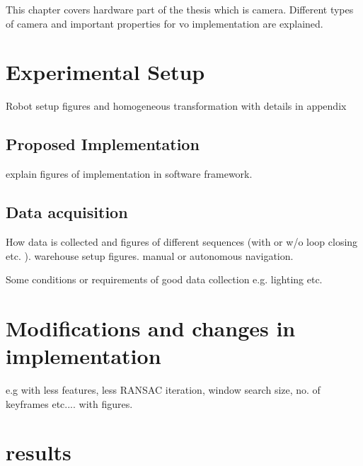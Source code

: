 This chapter covers hardware part of the thesis which is camera. Different types of camera and important properties for \acrshort{vo} implementation are explained.


\section{Experimental Setup}

Robot setup figures and homogeneous transformation with details in appendix

\subsection{Proposed Implementation}
explain figures of implementation in software framework. 

\subsection{Data acquisition}

How data is collected and figures of different sequences (with or w/o loop closing etc. ). warehouse setup figures. 
manual or autonomous navigation.

Some conditions or requirements of good data collection e.g. lighting etc. 

\section{Modifications and changes in implementation}
e.g with less features, less RANSAC iteration, window search size, no. of keyframes etc....
with figures.


\section{results}
